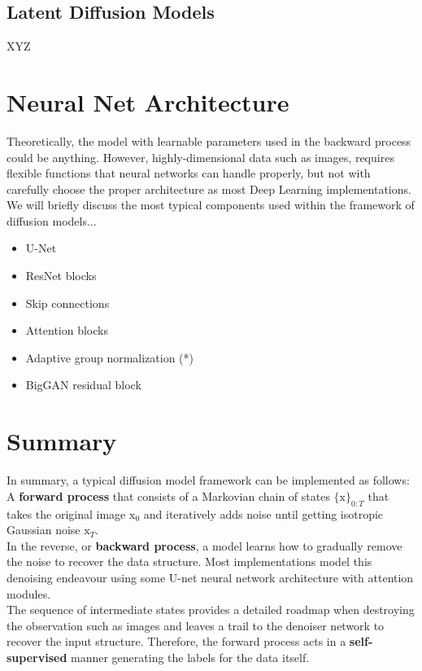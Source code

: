 \subsection{Latent Diffusion Models}

XYZ

\section{Neural Net Architecture}

Theoretically, the model with learnable parameters used in the backward process could be anything. However, highly-dimensional data such as images, requires flexible functions that neural networks can handle properly, but not with carefully choose the proper architecture as most Deep Learning implementations. We will briefly discuss the most typical components used within the framework of diffusion models...\\

\begin{itemize}
    \item U-Net
    \item ResNet blocks
    \item Skip connections
    \item Attention blocks
    \item Adaptive group normalization (*)
    \item BigGAN residual block
\end{itemize}


\section{Summary}

In summary, a typical diffusion model framework can be implemented as follows:\\

A \textbf{forward process} that consists of a Markovian chain of states $\{\mathrm{x}\}_{0:T}$ that takes the original image $\mathrm{x}_0$ and iteratively adds noise until getting isotropic Gaussian noise $\mathrm{x}_{T}$. \\

In the reverse, or \textbf{backward process}, a model learns how to gradually remove the noise to recover the data structure. Most implementations model this denoising endeavour using some U-net neural network architecture with attention modules. \\

The sequence of intermediate states provides a detailed roadmap when destroying the observation such as images and leaves a trail to the denoiser network to recover the input structure. Therefore, the forward process acts in a \textbf{self-supervised} manner generating the labels for the data itself. \\

